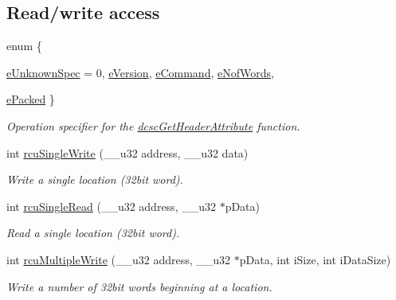 \subsection*{Read/write access}
\begin{CompactItemize}
\item 
enum \{ \par
\hyperlink{group__dcsc__msg__buffer__access_gg0411cd49bb5b71852cecd93bcbf0ca2d369f66006fcdc9be0ebe0e56d0dce6c9}{e\-Unknown\-Spec} =  0, 
\hyperlink{group__dcsc__msg__buffer__access_gg0411cd49bb5b71852cecd93bcbf0ca2d1d0f8ecdb452c7ff543d75a98c9cc6b4}{e\-Version}, 
\hyperlink{group__dcsc__msg__buffer__access_gg0411cd49bb5b71852cecd93bcbf0ca2d203d36b00bb0c66542bfbb41283bca1f}{e\-Command}, 
\hyperlink{group__dcsc__msg__buffer__access_gg0411cd49bb5b71852cecd93bcbf0ca2d5c578774a774b0e23c176c8a045b742b}{e\-Nof\-Words}, 
\par
\hyperlink{group__dcsc__msg__buffer__access_gg0411cd49bb5b71852cecd93bcbf0ca2d6678ba12b9d3d2b765aa92a0d12bc1b7}{e\-Packed}
 \}
\begin{CompactList}\small\item\em Operation specifier for the \hyperlink{group__dcsc__msg__buffer__access_g975e68b162a4d0786e1902c895349b02}{dcsc\-Get\-Header\-Attribute} function. \item\end{CompactList}\item 
int \hyperlink{group__dcsc__msg__buffer__access_g5b2ecab6b0a6383afebde1ea486dae43}{rcu\-Single\-Write} (\_\-\_\-u32 address, \_\-\_\-u32 data)
\begin{CompactList}\small\item\em Write a single location (32bit word). \item\end{CompactList}\item 
int \hyperlink{group__dcsc__msg__buffer__access_g339b5922513d0f0211d7962234faa24f}{rcu\-Single\-Read} (\_\-\_\-u32 address, \_\-\_\-u32 $\ast$p\-Data)
\begin{CompactList}\small\item\em Read a single location (32bit word). \item\end{CompactList}\item 
int \hyperlink{group__dcsc__msg__buffer__access_ge20afbfc92c897546e37126188804309}{rcu\-Multiple\-Write} (\_\-\_\-u32 address, \_\-\_\-u32 $\ast$p\-Data, int i\-Size, int i\-Data\-Size)
\begin{CompactList}\small\item\em Write a number of 32bit words beginning at a location. \item\end{CompactList}\item 

\end{CompactItemize}
